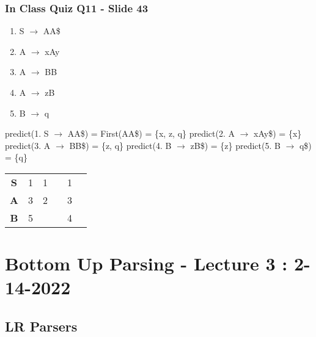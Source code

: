 \documentclass{report}
\begin{document}
\subsection{In Class Quiz Q11 - Slide 43}
\vspace{-1.5em}
\begin{multicols}{2}
  \begin{enumerate}
    \setlength\itemsep{-.25em}
    \item S $\rightarrow$ AA\$
    \item A $\rightarrow$ xAy
    \item A $\rightarrow$ BB
    \item A $\rightarrow$ zB
    \item B $\rightarrow$ q\newline\newline
  \end{enumerate}
  \setlength{\leftskip}{-12em}
  predict(1. S $\rightarrow$ AA\$) = First(AA\$) = \{x, z, q\}\newline
  predict(2. A $\rightarrow$ xAy\$) = \{x\}\newline
  predict(3. A $\rightarrow$ BB\$) = \{z, q\}\newline
  predict(4. B $\rightarrow$ zB\$) = \{z\}\newline
  predict(5. B $\rightarrow$ q\$) = \{q\}\newline
\end{multicols}
\vspace{-2em}
  \begin{tabular}{|c|c|c|c|c|c|}
    \hline
	  & \thead{q} & \thead{x} & \thead{y} & \thead{z} & \thead{\$}\\
    \hline
	\textbf{S} & 1 & 1 &   & 1 & \\
    \hline
	\textbf{A} & 3 & 2 &   & 3 & \\
    \hline
	\textbf{B} & 5 &   &   & 4 & \\
    \hline
  \end{tabular}\newline\newline

\chapter{Bottom Up Parsing - Lecture 3 : 2-14-2022}

\section{LR Parsers}
\end{document}
